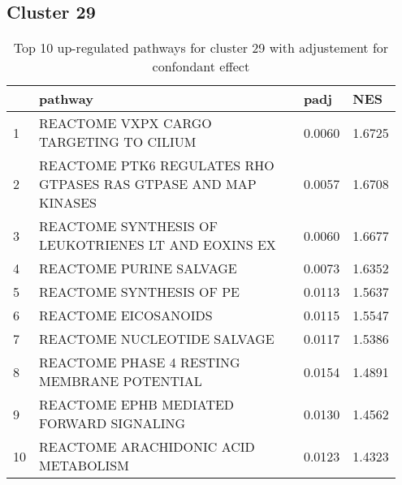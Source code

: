 \documentclass{article}
\begin{document}
\subsection{Cluster 29 }
\begin{table}[H]
\centering
\begin{tabular}{p{0.05\linewidth}p{0.7\linewidth}p{0.1\linewidth}p{0.1\linewidth}}
  \hline
 & pathway & padj & NES \\ 
  \hline
1 & REACTOME VXPX CARGO TARGETING TO CILIUM & 0.0060 & 1.6725 \\ 
  2 & REACTOME PTK6 REGULATES RHO GTPASES RAS GTPASE AND MAP KINASES & 0.0057 & 1.6708 \\ 
  3 & REACTOME SYNTHESIS OF LEUKOTRIENES LT AND EOXINS EX & 0.0060 & 1.6677 \\ 
  4 & REACTOME PURINE SALVAGE & 0.0073 & 1.6352 \\ 
  5 & REACTOME SYNTHESIS OF PE & 0.0113 & 1.5637 \\ 
  6 & REACTOME EICOSANOIDS & 0.0115 & 1.5547 \\ 
  7 & REACTOME NUCLEOTIDE SALVAGE & 0.0117 & 1.5386 \\ 
  8 & REACTOME PHASE 4 RESTING MEMBRANE POTENTIAL & 0.0154 & 1.4891 \\ 
  9 & REACTOME EPHB MEDIATED FORWARD SIGNALING & 0.0130 & 1.4562 \\ 
  10 & REACTOME ARACHIDONIC ACID METABOLISM & 0.0123 & 1.4323 \\ 
   \hline
\end{tabular}
\caption{Top 10 up-regulated pathways for cluster 29 with adjustement for confondant effect} 
\label{tab:q3_2_conf_29}
\end{table}
\end{document}
